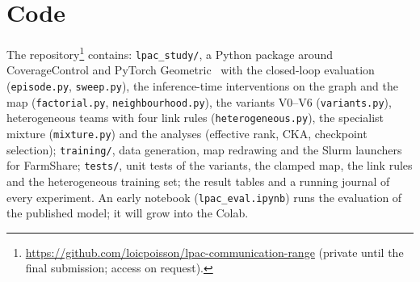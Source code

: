 \documentclass{article}
\begin{document}
\section{Code}
The repository\footnote{\url{https://github.com/loicpoisson/lpac-communication-range} (private until the final submission; access on request).} contains: \texttt{lpac\_study/}, a Python package around CoverageControl and PyTorch Geometric~\citep{fey2019pyg} with the closed-loop evaluation (\texttt{episode.py}, \texttt{sweep.py}), the inference-time interventions on the graph and the map (\texttt{factorial.py}, \texttt{neighbourhood.py}), the variants V0--V6 (\texttt{variants.py}), heterogeneous teams with four link rules (\texttt{heterogeneous.py}), the specialist mixture (\texttt{mixture.py}) and the analyses (effective rank, CKA, checkpoint selection); \texttt{training/}, data generation, map redrawing and the Slurm launchers for FarmShare; \texttt{tests/}, unit tests of the variants, the clamped map, the link rules and the heterogeneous training set; the result tables and a running journal of every experiment. An early notebook (\texttt{lpac\_eval.ipynb}) runs the evaluation of the published model; it will grow into the Colab.

\end{document}

